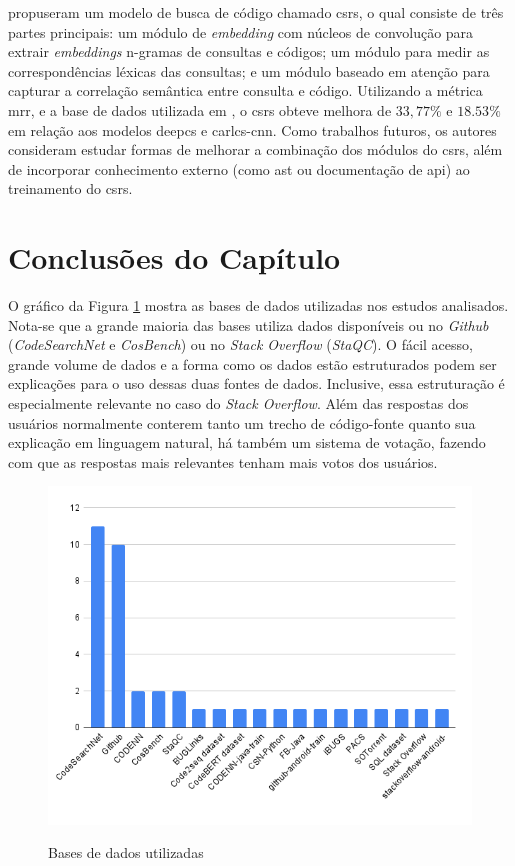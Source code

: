 \textcite{Cheng2022CSRSCS} propuseram um modelo de busca de código chamado \gls{csrs}, o qual consiste de três partes principais: um módulo de \textit{embedding} com núcleos de convolução para extrair \textit{embeddings} n-gramas de consultas e códigos; um módulo para medir as correspondências léxicas das consultas; e um módulo baseado em atenção para capturar a correlação semântica entre consulta e código. Utilizando a métrica \gls{mrr}, e a base de dados utilizada em \cite{Gu2018DeepCS}, o \gls{csrs} obteve melhora de $33,77\%$ e $18.53\%$ em relação aos modelos \gls{deepcs} e \gls{carlcs-cnn}. Como trabalhos futuros, os autores consideram estudar formas de melhorar a combinação dos módulos do \gls{csrs}, além de incorporar conhecimento externo (como \gls{ast} ou documentação de \gls{api}) ao treinamento do \gls{csrs}.

\section{Conclusões do Capítulo}
O gráfico da Figura \ref{fig:related-datasets} mostra as bases de dados utilizadas nos estudos analisados. Nota-se que a grande maioria das bases utiliza dados disponíveis ou no \textit{Github} (\textit{CodeSearchNet} e \textit{CosBench}) ou no \textit{Stack Overflow} (\textit{StaQC}). O fácil acesso, grande volume de dados e a forma como os dados estão estruturados podem ser explicações para o uso dessas duas fontes de dados. Inclusive, essa estruturação é especialmente relevante no caso do \textit{Stack Overflow}. Além das respostas dos usuários normalmente conterem tanto um trecho de código-fonte quanto sua explicação em linguagem natural, há também um sistema de votação, fazendo com que as respostas mais relevantes tenham mais votos dos usuários.
\begin{figure}[htbp]
    \centering
    \caption{Bases de dados utilizadas}
    \includegraphics[scale=0.5]{./resources/images/relacionados/datasets.png}
    \label{fig:related-datasets}
\end{figure}

